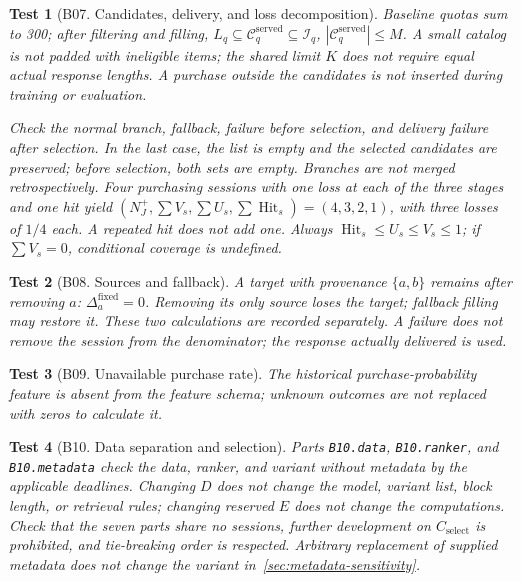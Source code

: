 \documentclass[12pt,a4paper]{article}
\newcommand{\code}[1]{{\ttfamily\small\nolinkurl{#1}}}
\theoremstyle{plainru}
\newtheorem{testcase}{Test}[section]
\begin{document}
\begin{testcase}[B07. Candidates, delivery, and loss decomposition]
Baseline quotas sum to 300; after filtering and filling,
$L_q\subseteq\mathcal C_q^{\mathrm{served}}\subseteq\mathcal I_q$,
$|\mathcal C_q^{\mathrm{served}}|\le M$.
A small catalog is not padded with ineligible items; the shared limit $K$
does not require equal actual response lengths.
A purchase outside the candidates is not inserted during training or evaluation.

Check the normal branch, fallback, failure before selection, and delivery failure
after selection. In the last case, the list is empty and the selected candidates
are preserved; before selection, both sets are empty. Branches are not merged retrospectively.
Four purchasing sessions with one loss at each of the three stages and one
hit yield $(N_J^+,\sum V_s,\sum U_s,\sum\operatorname{Hit}_s)
=(4,3,2,1)$, with three losses of $1/4$ each.
A repeated hit does not add one. Always
$\operatorname{Hit}_s\le U_s\le V_s\le1$;
if $\sum V_s=0$, conditional coverage is undefined.
\end{testcase}

\begin{testcase}[B08. Sources and fallback]
A target with provenance $\{a,b\}$ remains after removing $a$:
$\Delta_a^{\mathrm{fixed}}=0$. Removing its only source
loses the target; fallback filling may restore it.
These two calculations are recorded separately. A failure does not remove the session
from the denominator; the response actually delivered is used.
\end{testcase}

\begin{testcase}[B09. Unavailable purchase rate]
The historical purchase-probability feature is absent from the feature schema;
unknown outcomes are not replaced with zeros to calculate it.
\end{testcase}

\begin{testcase}[B10. Data separation and selection]
Parts \code{B10.data}, \code{B10.ranker}, and \code{B10.metadata}
check the data, ranker, and variant without metadata by the applicable deadlines.
Changing $D$ does not change the model, variant list, block length,
or retrieval rules; changing reserved $E$ does not change the computations.
Check that
the seven parts share no sessions, further development on $C_{\mathrm{select}}$ is prohibited,
and tie-breaking order is respected. Arbitrary replacement of supplied
metadata does not change the variant in~\ref{sec:metadata-sensitivity}.
\end{testcase}
\end{document}
